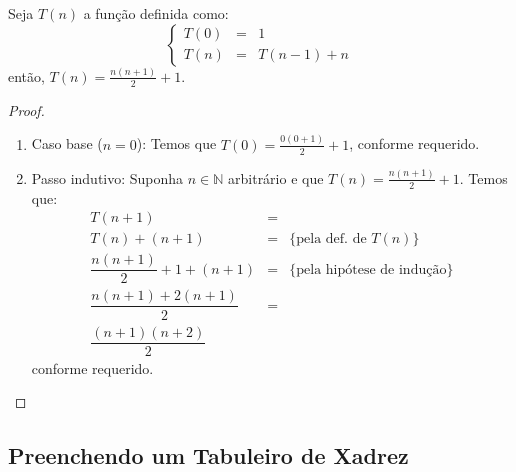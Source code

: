 \begin{Theorem}
Seja $T(n)$ a função definida como:
\[
\left\{
\begin{array}{lcl}
  T(0) & = & 1 \\
  T(n) & = & T(n - 1) + n
\end{array}
\right.
\]
então, $T(n) = \frac{n(n+1)}{2} + 1$.
\end{Theorem}
\begin{proof}
\verb| |\\
\begin{enumerate}
  \item[\ ]Caso base ($n = 0$): Temos que $T(0) = \frac{0(0 + 1)}{2} +
    1$, conforme requerido.
  \item[\ ]Passo indutivo: Suponha $n\in\mathbb{N}$ arbitrário e que
    $T(n) = \frac{n(n+1)}{2} + 1$. Temos que:
   \[
\begin{array}{lcl}
T(n + 1) & = \\
T(n) + (n + 1) & = & \{\text{pela def. de }T(n)\}\\
\dfrac{n(n+1)}{2} + 1 + (n + 1) & = & \{\text{pela hipótese de
  indução}\}\\
\dfrac{n(n + 1) + 2(n+1)}{2} & = & \\
\dfrac{(n + 1)(n + 2)}{2}
\end{array}
   \]
conforme requerido.
\end{enumerate}
\end{proof}

\subsection{Preenchendo um Tabuleiro de Xadrez}

